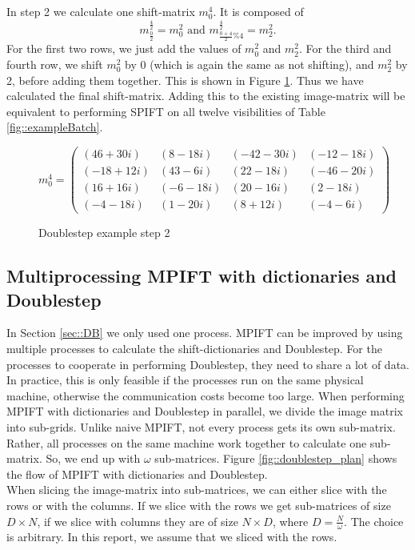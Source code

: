 \documentclass[12pt]{article}
\begin{document}
In step 2 we calculate one shift-matrix $m_0^4$. It is composed of
\[
m_{\frac{0}{2}}^{\frac{4}{2}}=m_0^2 \textrm{ and }
m_{\frac{0+4}{2}\%4}^{\frac{4}{2}}=m_2^2.
\]
For the first two rows, we just add the values of $m_0^2$ and $m_2^2$. For the third and fourth row, we shift $m_0^2$ by 0 (which is again the same as not shifting), and $m_2^2$ by 2, before adding them together. This is shown in Figure \ref{calc::doublestepEx2}. Thus we have calculated the final shift-matrix. Adding this to the existing image-matrix will be equivalent to performing SPIFT on all twelve visibilities of Table \ref{fig::exampleBatch}.


\begin{figure} [H]
	\begin{center}
$m_0^4=\begin{pmatrix}
(46+30i) & (8-18i) & (-42-30i) & (-12-18i) \\
(-18+12i) & (43-6i) & (22-18i) & (-46-20i) \\
(16+16i) & (-6-18i) & (20-16i) & (2-18i) \\
(-4-18i) & (1-20i) & (8+12i) & (-4-6i)
\end{pmatrix}$
	\end{center}
\caption{Doublestep example step 2}
\label{calc::doublestepEx2}
\end{figure}


\subsection{Multiprocessing MPIFT with dictionaries and Doublestep}
\label{sec::multiprocessingDoublestep}

In Section \ref{sec::DB} we only used one process. MPIFT can be improved by using multiple processes to calculate the shift-dictionaries and Doublestep. For the processes to cooperate in performing Doublestep, they need to share a lot of data. In practice, this is only feasible if the processes run on the same physical machine, otherwise the communication costs become too large.
When performing MPIFT with dictionaries and Doublestep in parallel, we divide the image matrix into sub-grids. Unlike naive MPIFT, not every process gets its own sub-matrix. Rather, all processes on the same machine work together to calculate one sub-matrix. So, we end up with $\omega$ sub-matrices. Figure \ref{fig::doublestep_plan} shows the flow of MPIFT with dictionaries and Doublestep.\\

	When slicing the image-matrix into sub-matrices, we can either slice with the rows or with the columns. If we slice with the rows we get sub-matrices of size $D\times N$, if we slice with columns they are of size $N\times D$, where $D=\frac{N}{\omega}$. The choice is arbitrary. In this report, we assume that we sliced with the rows.\\
\end{document}
